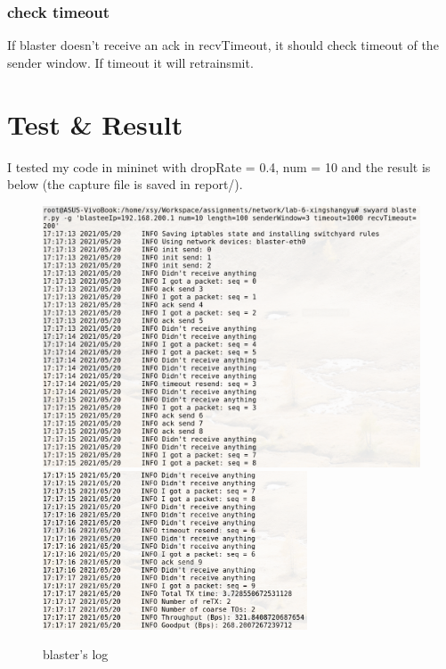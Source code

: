 \documentclass[12pt,a4paper,UTF8]{article}
\begin{document}
\subsubsection{check timeout}
If blaster doesn't receive an ack in recvTimeout, it should check timeout of the sender window. If timeout it will retrainsmit.


\section{Test \& Result}
I tested my code in mininet with dropRate = 0.4, num = 10 and the result is below (the capture file is saved in report/).
\begin{figure}[htbp]
	\centering
	\includegraphics[width=\textwidth]{2}
	\includegraphics[width=0.7\textwidth]{3}
	\caption{blaster's log}
\end{figure}
\end{document}
